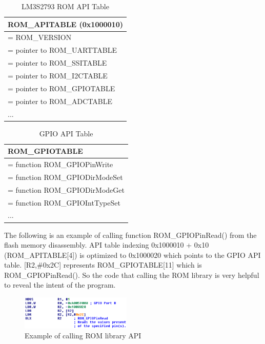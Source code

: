 \begin{center}
	\begin{table}
		\begin{tabular}{|p{7.2cm}|} 
			\hline
			ROM\_APITABLE (0x1000010) \\ [0.5ex] 
			\hline
			[0] = ROM\_VERSION \\
			\hline
			[1] = pointer to ROM\_UARTTABLE \\
			\hline
			[2] = pointer to ROM\_SSITABLE \\
			\hline
			[3] = pointer to ROM\_I2CTABLE \\
			\hline
			[4] = pointer to ROM\_GPIOTABLE \\
			\hline
			[5] = pointer to ROM\_ADCTABLE \\
			\hline
			... \\ 
			\hline
		\end{tabular}
		\caption{LM3S2793 ROM API Table}
		\label{tab:romtable}
	\end{table}
\end{center}

\begin{center}
	\begin{table}
		\begin{tabular}{|p{7.2cm}|} 
			\hline
			ROM\_GPIOTABLE \\ [0.5ex] 
			\hline
			[0] = function ROM\_GPIOPinWrite \\
			\hline
			[1] = function ROM\_GPIODirModeSet \\
			\hline
			[2] = function ROM\_GPIODirModeGet \\
			\hline
			[3] = function ROM\_GPIOIntTypeSet \\
			\hline
			... \\ 
			\hline
		\end{tabular}
		\caption{GPIO API Table}
		\label{tab:gpiotable}
	\end{table}
\end{center}


The following is an example of calling function ROM\_GPIOPinRead() from the flash memory disassembly. API table indexing 0x1000010 + 0x10 (ROM\_APITABLE[4]) is optimized to 0x1000020 which points to the GPIO API table. [R2,\#0x2C] represents ROM\_GPIOTABLE[11] which is ROM\_GPIOPinRead(). So the code that calling the ROM library is very helpful to reveal the intent of the program.


\begin{figure}[th]
	\includegraphics[width=0.47\textwidth]{figures/romapiexample}
	\centering
	\caption{Example of calling ROM library API}
	\label{fig:romapiexample}
\end{figure}



